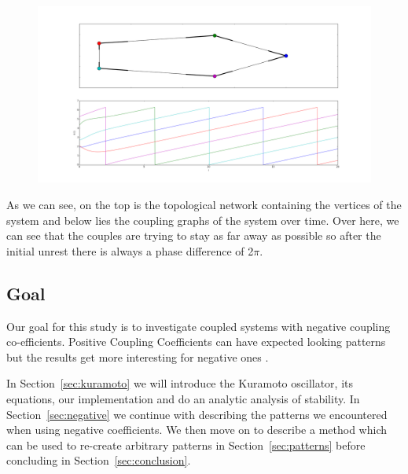 \begin{figure}[h!]
\centering
\includegraphics[width=\linewidth]{imgs/examplefigure}
\caption{}
\end{figure}

As we can see, on the top is the topological network containing the vertices of the system and below lies the coupling graphs of the system over time. Over here, we can see that the couples are trying to stay as far away as possible so after the initial unrest there is always a phase difference of 2$\pi$. 

\subsection{Goal}
Our goal for this study is to investigate coupled systems with negative coupling co-efficients. Positive Coupling Coefficients can have expected looking patterns but the results get more interesting for negative ones . 

In Section~\ref{sec:kuramoto} we will introduce the Kuramoto oscillator, its equations, our implementation and do an analytic analysis of stability. In Section~\ref{sec:negative} we continue with describing the patterns we encountered when using negative coefficients. We then move on to describe a method which can be used to re-create arbitrary patterns in Section~\ref{sec:patterns} before concluding in Section~\ref{sec:conclusion}. 



